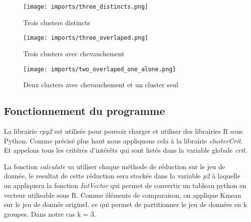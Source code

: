 \begin{center}
    \begin{figure}[ht!]
        \centering
        
        \texttt{[image: imports/three\_distincts.png]}
        
        \caption{Trois clusters distincts}
    \end{figure}
\end{center}

\begin{center}
    \begin{figure}[ht!]
        \centering
        
        \texttt{[image: imports/three\_overlaped.png]}
        
        \caption{Trois clusters avec chevauchement}
    \end{figure}
\end{center}


\begin{center}
    \begin{figure}[ht!]
        \centering
        
        \texttt{[image: imports/two\_overlaped\_one\_alone.png]}
        
        \caption{Deux clusters avec chevauchement et un cluster seul}
    \end{figure}
\end{center}


\subsection{Fonctionnement du programme}
La librairie \textit{rpy2} est utilisée pour pouvoir charger et utiliser des librairies R sous Python. Comme précisé plus haut
nous appliquons cela à la librairie \textit{clusterCrit}. Et appelons tous les critéres d'intérêts qui sont listés dans la variable globale \textit{crit}.

La fonction \textit{calculate} va utiliser chaque méthode de réduction sur le jeu de donnée, le resultat de cette réduction sera stockée dans
la variable \textit{p2} à laquelle on appliquera la fonction \textit{IntVector} qui permet de convertir un tableau python en vecteur utilisable sous R. 
Comme éléments de comparaison, on applique Kmean sur le jeu de donnée originel. ce qui permet de partitionner le jeu de données en k groupes. 
Dans notre cas k = 3.

